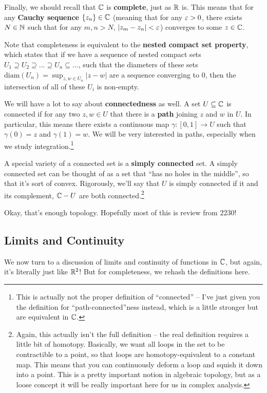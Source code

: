 Finally, we should recall that $\mathbb C$ is \textbf{complete}, just as $\mathbb R$ is. This means that for any \textbf{Cauchy sequence} $\left\{ z_n \right\} \in \mathbb C$ (meaning that for any $\varepsilon > 0$, there exists $N \in \mathbb N$ such that for any $m, n > N$, $|z_m - z_n| < \varepsilon$) converges to some $z \in \mathbb C$.

Note that completeness is equivalent to the \textbf{nested compact set property}, which states that if we have a sequence of nested compact sets $U_1 \supseteq U_2 \supseteq \dots \supseteq U_n \subseteq \dots$, such that the diameters of these sets $\textrm{diam}(U_n) = \sup_{z, w \in U_n} |z - w|$ are a sequence converging to 0, then the intersection of all of these $U_i$ is non-empty.

We will have a lot to say about \textbf{connectedness} as well. A set $U \subseteq \mathbb C$ is connected if for any two $z, w \in U$ that there is a \textbf{path} joining $z$ and $w$ in $U$. In particular, this means there exists a continuous map $\gamma: [0,1] \to U$ such that $\gamma(0) = z$ and $\gamma(1) = w$. We will be very interested in paths, especially when we study integration.\footnote{This is actually not the proper definition of ``connected'' -- I've just given you the definition for ``path-connected''ness instead, which is a little stronger but are equivalent in $\mathbb C$.}

A special variety of a connected set is a \textbf{simply connected} set. A simply connected set can be thought of as a set that ``has no holes in the middle'', so that it's sort of convex. Rigorously, we'll say that $U$ is simply connected if it and its complement, $\mathbb C - U$ are both connected.\footnote{Again, this actually isn't the full definition -- the real definition requires a little bit of homotopy. Basically, we want all loops in the set to be contractible to a point, so that loops are homotopy-equivalent to a constant map. This means that you can continuously deform a loop and squish it down into a point. This is a pretty important notion in algebraic topology, but as a loose concept it will be really important here for us in complex analysis.}


Okay, that's enough topology. Hopefully most of this is review from 2230!

\subsection{Limits and Continuity}
We now turn to a discussion of limits and continuity of functions in $\mathbb C$, but again, it's literally just like $\mathbb R^2$! But for completeness, we rehash the definitions here.

